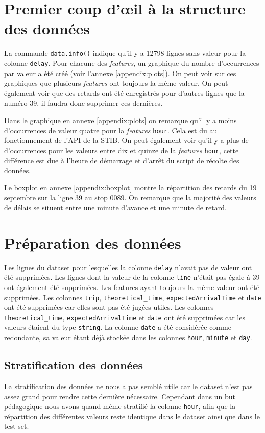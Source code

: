 \section{Premier coup d'œil à la structure des données}
La commande \lstinline!data.info()! indique qu'il y a 12798 lignes sans valeur pour la colonne \lstinline!delay!. Pour chacune des \textit{features}, un graphique du nombre d'occurrences par valeur a été créé (voir l'annexe \ref{appendix:plots}). On peut voir sur ces graphiques que plusieurs \textit{features} ont toujours la même valeur. On peut également voir que des retards ont été enregistrés pour d'autres lignes que la numéro 39, il faudra donc supprimer ces dernières.

Dans le graphique en annexe \ref{appendix:plots} on remarque qu'il y a moins d'occurrences de valeur quatre pour la \textit{features} \lstinline!hour!. Cela est du au fonctionnement de l'API de la STIB. On peut également voir qu'il y a plus de d'occurrences pour les valeurs entre dix et quinze de la \textit{features} \lstinline!hour!, cette différence est due à l'heure de démarrage et d'arrêt du script de récolte des données.

Le boxplot en annexe \ref{appendix:boxplot} montre la répartition des retards du 19 septembre sur la ligne 39 au stop 0089. On remarque que la majorité des valeurs de délais se situent entre une minute d'avance et une minute de retard.

\section{Préparation des données}
Les lignes du dataset pour lesquelles la colonne \lstinline!delay! n'avait pas de valeur ont été supprimées. Les lignes dont la valeur de la colonne \lstinline!line! n'était pas égale à 39 ont également été supprimées. Les features ayant toujours la même valeur ont été supprimées. Les colonnes \lstinline!trip!, \lstinline!theoretical_time!, \lstinline!expectedArrivalTime! et \lstinline!date! ont été supprimées car elles sont pas été jugées utiles. Les colonnes \lstinline!theoretical_time!, \lstinline!expectedArrivalTime! et \lstinline!date! ont été supprimées car les valeurs étaient du type \lstinline!string!. La colonne \lstinline!date! a été considérée comme redondante, sa valeur étant déjà stockée dans les colonnes \lstinline!hour!, \lstinline!minute! et \lstinline!day!.

\subsection{Stratification des données}
La stratification des données ne nous a pas semblé utile car le dataset n'est pas assez grand pour rendre cette dernière nécessaire. Cependant dans un but pédagogique nous avons quand même stratifié la colonne \lstinline!hour!, afin que la répartition des différentes valeurs reste identique dans le dataset ainsi que dans le test-set.

